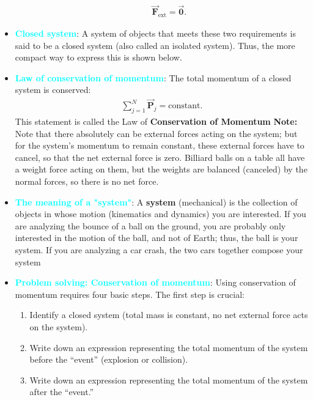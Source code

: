 \documentclass{report}
\begin{document}
\begin{itemize}
\begin{itemize}
                    \begin{align*}
                        \vec{\mathbf{F}}_{\text{ext}} = \vec{\mathbf{0}}
                    .\end{align*}
            \end{itemize}
        \item \textbf{\textcolor{cyan}{Closed system}}:
            A system of objects that meets these two requirements is said to be a closed system (also called an isolated system). Thus, the more compact way to express this is shown below.
        \item \textbf{\textcolor{cyan}{Law of conservation of momentum}}:
            The total momentum of a closed system is conserved:
            \begin{align*}
                \sum_{j=1}^{N}\vec{\mathbf{P}}_{j} = \text{constant}
            .\end{align*}
            \bigbreak \noindent 
            This statement is called the Law of \textbf{Conservation of Momentum}
            \bigbreak \noindent 
            \textbf{Note:} Note that there absolutely can be external forces acting on the system; but for the system’s momentum to remain constant, these external forces have to cancel, so that the net external force is zero. Billiard balls on a table all have a weight force acting on them, but the weights are balanced (canceled) by the normal forces, so there is no net force.
        \item \textbf{\textcolor{cyan}{The meaning of a "system"}}:
            A \textbf{system} (mechanical) is the collection of objects in whose motion (kinematics and dynamics) you are interested. If you are analyzing the bounce of a ball on the ground, you are probably only interested in the motion of the ball, and not of Earth; thus, the ball is your system. If you are analyzing a car crash, the two cars together compose your system
        \item \textbf{\textcolor{cyan}{Problem solving: Conservation of momentum}}:
            Using conservation of momentum requires four basic steps. The first step is crucial:
            \begin{enumerate}
                \item Identify a closed system (total mass is constant, no net external force acts on the system).
                \item Write down an expression representing the total momentum of the system before the “event” (explosion or collision).
                \item Write down an expression representing the total momentum of the system after the “event.”

\end{enumerate}
\end{itemize}
\end{document}
